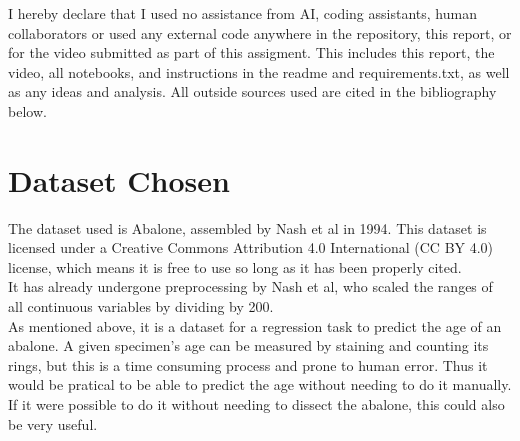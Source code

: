 \documentclass[a4paper, 12pt]{article}
\begin{document}
I hereby declare that I used no assistance from AI, coding assistants, human collaborators or used any external code anywhere in the repository, this report,  or for the video submitted as part of this assigment. 
This includes this report, the video, all notebooks, and instructions in the readme and requirements.txt, as well as any ideas and analysis. 
All outside sources used are cited in the bibliography below.

\section{Dataset Chosen}
The dataset used is Abalone\cite{abalone}, assembled by Nash et al in 1994.
This dataset is licensed under a Creative Commons Attribution 4.0 International (CC BY 4.0) license, which means it is free to use so long as it has been properly cited.\\
It has already undergone preprocessing by Nash et al, who scaled the ranges of all continuous variables by dividing by 200.\\

As mentioned above, it is a dataset for a regression task to predict the age of an abalone. 
A given specimen's age can be measured by staining and counting its rings, but this is a time consuming process and prone to human error. Thus it would be pratical to be able to predict the age without needing to do it manually. If it were possible to do it without needing to dissect the abalone, this could also be very useful.\\  
\end{document}
